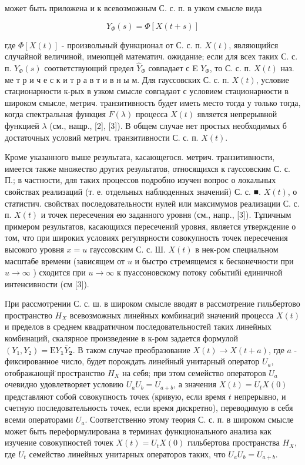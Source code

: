 \documentclass[10pt]{article}
\begin{document}
может быть приложена и к всевозможным С. с. п. в узком смысле вида



\[

Y_{\Phi}(s)=\Phi[X(t+s)]

\]



где $\Phi[X(t)]$ - произвольный функционал от С. с. п. $X(t)$, являющийся случайной величиной, имеюпцей математич. ожидание; если для всех таких С. с. п. $Y_{\Phi}(s)$ соответствующий предел $\hat{Y}_{\Phi}$ совпадает с E $Y_{\Phi}$, то С. с. п. $X(t)$ наз. ме т р и ч е с к и т р а в т и в н ы м. Для гауссовских С. с. п. $X(t)$, условие стационарности к-рых в узком смысле совпадаөт с условием стационарности в широком смысле, метрич. транзитивность будет иметь место тогда у только тогда, когда спектральная функция $F(\lambda)$ процесса $X(t)$ является непрерывной функцией $\lambda$ (см., нащр., [2], [3]). В общем случае нет простых необходимых б достаточных условий метрич. транзитивности С. с. п. $X(t)$.



Кроме указанного выше результата, касающегося. метрич. транзитивности, имеется также множество других результатов, относящихся к гауссовским С. с. П.; в частности, для таких процессов подробно изучен вопрос о локальных свойствах реализаций (т. е. отдельных наблюденных значений) С. с. ■. $X(t)$, о статистич. свойствах последовательности нулей или максимумов реализации С. с. п. $X(t)$ и точек пересечения ею заданного уровня (см., напр., [3]). Тұпичным примером результатов, касающихся пересечений уровня, является утверждение о том, что при широких условиях регулярности совокупность точек пересечения высокого уровня $x=u$ гауссовским С. с. Ш. $X(t)$ в нек-ром специальном масштабе времени (зависящем от $u$ и быстро стремящемся к бесконечности при $u \rightarrow \infty$ ) сходится при $u \rightarrow \infty$ к пуассоновскому потоку событийі единичной интенсивности (см [3]).



При рассмотрении С. с. ш. в широком смысле вводят в рассмотрение гильбертово пространство $H_{X}$ всевозможных линейных комбинаций значений процесса $X(t)$ и пределов в среднем квадратичном последовательностей таких линейных комбинаций, скалярное произведение в к-ром задается формулой $\left(Y_{1}, Y_{2}\right)=\mathrm{E} Y_{\mathbf{1}} \bar{Y}_{\mathbf{2}}$. В таком случае преобразование $X(t) \rightarrow X(t+a)$, где $a$ - фиксированное число, будет порождать линейный унитарный оператор $U_{a}$, отображающй̈ пространство $H_{X}$ на себя; при этом семейство операторов $U_{a}$ очевидно удовлетворяет условию $U_{a} U_{b}=U_{a+b}$, а значения $X(t)=U_{t} X(0)$ представляют собой совокупность точек (кривую, если время $t$ непрерывно, и счетную последовательность точек, если время дискретно), переводимую в себя всеми операторами $U_{a}$. Соответственно этому теория С. с. п. в широком смысле может быть переформулирована в терминах функционального анализа как изучение совокупностей точек $X(t)=U_{t} X(0)$ гильбертова пространства $H_{X}$, где $U_{t}$ семейство линейных унитарных операторов таких, что $U_{a} U_{b}=U_{a+b}$.
\end{document}
